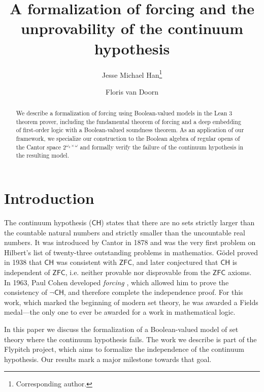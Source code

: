 \documentclass[a4paper,USenglish,cleveref, autoref]{lipics-v2019}
\title{A formalization of forcing and the unprovability of the continuum hypothesis} %
\author{Jesse Michael Han\footnote{Corresponding author.}}{Department of Mathematics, University of Pittsburgh \and \url{https://www.pitt.edu/~jmh288}}{jessemichaelhan@gmail.com}{}{}%
\author{Floris van Doorn}{Department of Mathematics, University of Pittsburgh \and \url{http://florisvandoorn.com/}}{fpvdoorn@gmail.com}{}{}
\theoremstyle{theorem}
\theoremstyle{definition}
\begin{document}
\maketitle

\begin{abstract}
We describe a formalization of forcing using Boolean-valued models in the Lean 3 theorem prover, including the fundamental theorem of forcing and a deep embedding of first-order logic with a Boolean-valued soundness theorem. As an application of our framework, we specialize our construction to the Boolean algebra of regular opens of the Cantor space $2^{\omega_2 \times \omega}$ and formally verify the failure of the continuum hypothesis in the resulting model.
\end{abstract}

\section*{Introduction}
The continuum hypothesis ($\mathsf{CH}$) states that there are no sets strictly larger than the countable natural numbers and strictly smaller than the uncountable real numbers. It was introduced by Cantor \cite{cantor1878beitrag} in 1878 and was the very first problem on Hilbert's list of twenty-three outstanding problems in mathematics. G\"odel \cite{godel1938consistency} proved in 1938 that $\mathsf{CH}$ was consistent with $\mathsf{ZFC}$, and later conjectured that $\mathsf{CH}$ is independent of $\mathsf{ZFC}$, i.e. neither provable nor disprovable from the $\mathsf{ZFC}$ axioms. In 1963, Paul Cohen developed \emph{forcing} \cite{cohen-the-independence-of-the-continuum-hypothesis-1,cohen1964independence2}, which allowed him to prove the consistency of $\neg \mathsf{CH}$, and therefore complete the independence proof. For this work, which marked the beginning of modern set theory, he was awarded a Fields medal---the only one to ever be awarded for a work in mathematical logic.

In this paper we discuss the formalization of a Boolean-valued model of set theory where the continuum hypothesis fails. %
The work we describe is part of the Flypitch project, which aims to formalize the independence of the continuum hypothesis. Our results mark a major milestone towards that goal.
\end{document}
